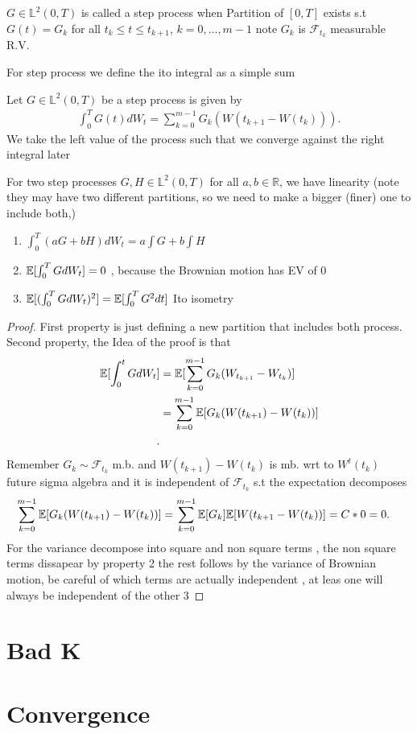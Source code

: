 \begin{definition}
  $G \in  \mathbb{L}^2(0,T)$  is called a step process when Partition of $[0,T]$ exists 
  s.t $G(t) = G_k$ for all $t_k \le  t \le t_{k+1}$, $k=0,\ldots ,m-1$ note $G_k$ is $\mathcal{F}_{t_k}$ measurable R.V.
\end{definition}
For step process we define the ito integral as a simple sum 
\begin{definition}
 Let $G \in  \mathbb{L}^2(0,T)$ be a step process  is given by 
 \begin{align*}
   \int_0^{T}  G(t) dW_t = \sum_{k=0}^{m-1}  G_k(W(t_{k+1}-W(t_k)))
 .\end{align*}
 We take the left value of the process such that we converge against the right integral later
\end{definition}
\begin{remark}
 For two step processes $G,H \in  \mathbb{L}^2(0,T)$  for all $a,b \in  \mathbb{R}$,
 we have linearity (note they may have two different partitions, so we need to make a bigger (finer) one to include both,)\\[1ex]
 \begin{enumerate}
   \item $\int_0^{T} (aG+bH) dW_t = a\int G + b \int  H$ 
   \item $\mathbb{E}[\int_0^{T} G dW_t] = 0$ , because the Brownian motion has EV of 0
   \item $\mathbb{E}[(\int_0^{T} G dW_t )^2 ]= \mathbb{E}[\int_{0}^{T}G^2 dt ]$  Ito isometry
 \end{enumerate}
\end{remark}
\begin{proof}
  First property is just defining a new partition that includes both process.
  Second property, the Idea of the proof is that
  \begin{align*}
    \mathbb{E}[\int_0^{t} G d W_t ] &= \mathbb{E}[\sum_{k=0}^{m-1}G_k(W_{t_{k+1}}-W_{t_k}) ]  \\
                            &= \sum_{k=0}^{m-1}\mathbb{E}[G_k(W(t_{k+1})-W(t_k))]  \\
  .\end{align*}
  Remember $G_k \sim \mathcal{F}_{t_k}$ m.b. and $W(t_{k+1}) - W(t_k)$ is mb. wrt to $W^{t}(t_k) $ future sigma algebra
  and it is independent of $\mathcal{F}_{t_k}$ s.t the expectation decomposes 
  \begin{align*}
    \sum_{k=0}^{m-1}\mathbb{E}[G_k(W(t_{k+1})-W(t_k))]  &= \sum_{k=0}^{m-1} \mathbb{E}[G_k]\mathbb{E}[W(t_{k+1}-W(t_{k}))]  = C*0 = 0 
  .\end{align*}
  For the variance decompose into square and non square terms , the non square terms dissapear by property 2 the rest follows by the variance of 
  Brownian motion, be careful of which terms are actually independent , at leas one will always be independent of the other 3
\end{proof}
\section{Bad K}
\section{Convergence}
